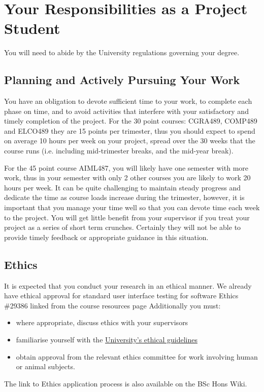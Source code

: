 \section{Your Responsibilities as a Project Student}

You will need to abide by the University regulations governing your
degree.

\subsection{Planning and Actively Pursuing Your Work}

You have an obligation to devote sufficient time to your work, to
complete each phase on time, and to avoid activities that interfere
with your satisfactory and timely completion of the project.  
For the 30 point courses: CGRA489, COMP489 and ELCO489
they are 15 points per trimester, thus you should expect to spend 
on average 10 hours per week on your project,
spread over the 30 weeks that the course runs (i.e. including
mid-trimester breaks, and the mid-year break). 


For the 45 point course AIML487, you will likely have one semester with 
more work, thus in your semester with only 2 other courses you are likely to work 20 hours per week.
It can be quite challenging to maintain steady progress and dedicate the time as
course loads increase during the trimester, however, it is important
that you manage your time well so that you can devote time each week to the project.  
You will get little benefit from your
supervisor if you treat your project as a series of short term crunches.
Certainly they will not be able to provide timely feedback or
appropriate guidance in this situation.

\subsection{Ethics}

It is expected that you conduct your research in an ethical
manner.  We already have ethical approval for standard
user interface testing for software Ethics \#29386 linked from the course resources page
Additionally you must:
\begin{itemize}
\item where appropriate, discuss ethics with your supervisors
\item familiarise yourself with the \href{https://www.wgtn.ac.nz/research/support/ethics}{University’s ethical guidelines}
\item obtain approval from the relevant ethics committee for work involving human or animal subjects.
\end{itemize}
The link to Ethics application process is also available on the BSc Hons Wiki.

